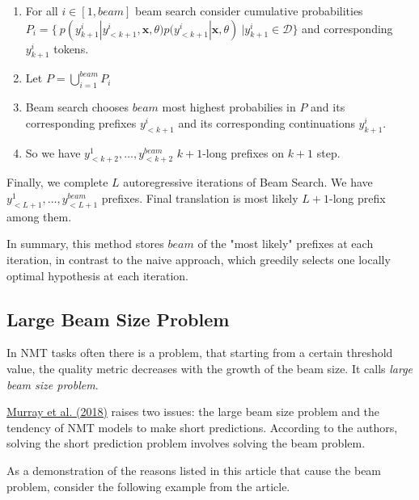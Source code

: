 \documentclass[a4paper,14pt]{extarticle}
\newcommand{\bibref}[3]{\hyperlink{#1}{#2 (#3)}}
\begin{document}
	\begin{enumerate}
		\item For all $i \in [1, beam]$ beam search consider cumulative probabilities \\ $P_i = \{ ~p(y_{k+1}^i | y_{<k+1}^i, \textbf{x}, \theta)p(y_{<k+1}^i | \textbf{x}, \theta) ~ | y_{k+1}^i \in \mathcal{D}\}$ and corresponding $y_{k+1}^i$ tokens.
		
		\item Let $P = \bigcup_{i=1}^{beam} P_i$
		
		\item Beam search chooses $beam$ most highest probabilies in $P$ and its corresponding prefixes $y_{<k+1}^{i}$ and its corresponding continuations $y_{k+1}^i$.
		
		\item So we have $y_{<k+2}^1, \dots, y_{<k+2}^{beam}$ $k+1$-long prefixes on $k+1$ step.
	\end{enumerate}
	
	Finally, we complete $L$ autoregressive iterations of Beam Search. We have $y_{<L+1}^1, \dots, y_{<L+1}^{beam}$ prefixes. Final translation is most likely $L+1$-long prefix among them.
	
	In summary, this method stores $beam$ of the "most likely" prefixes at each iteration, in contrast to the naive approach, which greedily selects one locally optimal hypothesis at each iteration.
	
	\subsection{Large Beam Size Problem}
	In NMT tasks often there is a problem, that starting from a certain threshold value, the quality metric decreases with the growth of the beam size. It calls \textit{large beam size problem}.
	
	\bibref{corr_len_bias}{Murray et al.}{2018} raises two issues: the large beam size problem and the tendency of NMT models to make short predictions. According to the authors, solving the short prediction problem involves solving the beam problem.
	
	As a demonstration of the reasons listed in this article that cause the beam problem, consider the following example from the article.
	
	\begin{figure}[t]
		
	\end{figure}
	
\end{document}
